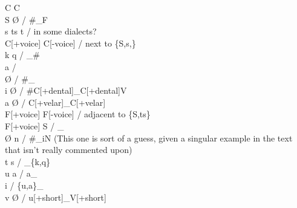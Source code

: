 \documentclass[11pt]{article}
\begin{document}
C\textipa{:} \textrightarrow\hspace{0pt} C \\
S \textrightarrow\hspace{0pt} \O\hspace{0pt} / \#_F \\
s \textrightarrow\hspace{0pt} ts \textrightarrow\hspace{0pt} t / in some dialects? \\
C[+voice] \textrightarrow\hspace{0pt} C[-voice] / next to \{S,s,\} \\
 \textrightarrow\hspace{0pt} k q / _\# \\
 \textrightarrow\hspace{0pt} a / \\
 \textrightarrow\hspace{0pt} \O\hspace{0pt} / \#_ \\
i \textrightarrow\hspace{0pt} \O\hspace{0pt} / \#C[+dental]_C[+dental]V \\
a \textrightarrow\hspace{0pt} \O\hspace{0pt} / C[+velar]_C[+velar] \\
F[+voice] \textrightarrow\hspace{0pt} F[-voice] / adjacent to \{S,ts\} \\
F[+voice] \textrightarrow\hspace{0pt} S / _ \\
\O \textrightarrow\hspace{0pt} n / \#_iN (This one is sort of a guess, given a singular example in the text that isn't really commented upon) \\
t \textrightarrow\hspace{0pt} s / _\{k,q\} \\
u \textrightarrow\hspace{0pt} a / a_ \\
 \textrightarrow\hspace{0pt} i / \{u,a\}_ \\
v \textrightarrow\hspace{0pt} \O\hspace{0pt} / u[+short]_V[+short] \\
\end{document}
